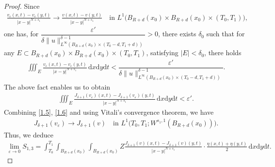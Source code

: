 \documentclass[reqno,10pt]{amsart}
\numberwithin{equation}{section}
\begin{document}
\begin{proof}
	Since
	\begin{align*}
		\frac{v_{\varepsilon}(x,t)-v_{\varepsilon}(y,t)}{|x-y|^{N+s_1}}\rightarrow\frac{v(x,t)-v(y,t)}{|x-y|^{N+s_1}}\quad\text{in }L^1\bigl( B_{R+d}(x_0)\times B_{R+d}(x_0)\times (T_0,T_1)\bigl), 
	\end{align*}
	one has, for $\dfrac{\varepsilon'}{\delta\|u\|^{\delta-1}_{L^\infty\left( B_{R+d}(x_0)\times(T_0-d,T_1+d)\right)}}>0$, there exists $\delta_0$ such that for any $E\subset B_{R+d}(x_0)\times B_{R+d}(x_0)\times(T_0,T_1)$, satisfying $|E|<\delta_0$, there holds
	\begin{align*}
		\iiint_E\frac{v_{\varepsilon}(x,t)-v_{\varepsilon}(y,t)}{|x-y|^{N+s_1}}\,\mathrm{d}x\mathrm{d}y\mathrm{d}t<\dfrac{\varepsilon'}{\delta\|u\|^{\delta-1}_{L^\infty\left( B_{R+d}(x_0)\times(T_0-d,T_1+d)\right)}}.
	\end{align*}
	The above fact enables us to obtain
	\begin{align}
		\label{1.6}
		\iiint_E\frac{J_{\delta+1}(v_\varepsilon)(x,t)-J_{\delta+1}(v_\varepsilon)(y,t)}{|x-y|^{N+s_1}}\,\mathrm{d}x\mathrm{d}y\mathrm{d}t<\varepsilon'.
	\end{align}
	Combining \eqref{1.5}, \eqref{1.6} and using Vitali's convergence theorem, we have
	\begin{align*}
		J_{\delta+1}(v_\varepsilon)\rightarrow J_{\delta+1}(v)\quad\text{in }L^1\bigl(T_0,T_1;W^{s_1,1}(B_{R+d}(x_0))\bigl).
	\end{align*}
	Thus, we deduce
	\begin{align*}
		\lim\limits_{\varepsilon\rightarrow0}S_{1,3}=\int_{T_0}^{T_1}\int_{B_{R+d}(x_0)}\int_{B_{R+d}(x_0)}Z\frac{J_{\delta+1}(v)(x,t)-J_{\delta+1}(v)(y,t)}{|x-y|^{N+s_1}}\cdot\frac{\eta(x,t)+\eta(y,t)}{2}\,\mathrm{d}x\mathrm{d}y\mathrm{d}t.
	\end{align*}
	

\end{proof}
\end{document}
